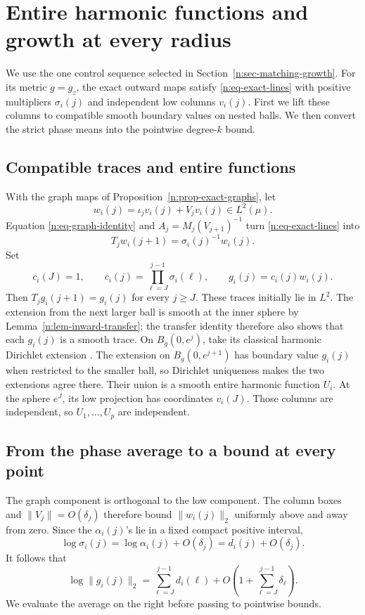 \section{Entire harmonic functions and growth at every radius}
\label{n:sec-growth}

We use the one control sequence selected in
Section~\ref{n:sec-matching-growth}. For its metric $g=g_z$, the exact
outward maps satisfy \eqref{n:eq-exact-lines} with positive multipliers
$\sigma_i(j)$ and independent low columns $v_i(j)$. First we lift these
columns to compatible smooth boundary values on nested balls. We then
convert the strict phase means into the pointwise degree-$k$ bound.

\subsection{Compatible traces and entire functions}

With the graph maps of Proposition~\ref{n:prop-exact-graphs}, let
\[
 w_i(j)=\iota_jv_i(j)+V_jv_i(j)\in L^2(\mu).
\]
Equation \eqref{n:eq-graph-identity} and \(A_j=M_j(V_{j+1})^{-1}\) turn
\eqref{n:eq-exact-lines} into
\[
 T_jw_i(j+1)=\sigma_i(j)^{-1}w_i(j).
\]
Set
\[
 c_i(J)=1,\qquad
 c_i(j)=\prod_{\ell=J}^{j-1}\sigma_i(\ell),\qquad
 g_i(j)=c_i(j)w_i(j).
\]
Then \(T_jg_i(j+1)=g_i(j)\) for every \(j\geq J\).
These traces initially lie in \(L^2\).  The extension from the next larger
ball is smooth at the inner sphere by Lemma~\ref{n:lem-inward-transfer};
the transfer identity therefore also shows that each \(g_i(j)\) is a smooth
trace.  On \(B_g(0,e^j)\), take its classical harmonic Dirichlet extension
\cite[Theorem~6.14, p.~107]{GilbargTrudinger}.  The
extension on \(B_g(0,e^{j+1})\) has boundary value \(g_i(j)\) when restricted
to the smaller ball, so Dirichlet uniqueness makes the two extensions
agree there.  Their union is a smooth entire harmonic function \(U_i\).
At the sphere \(e^J\), its low projection has coordinates \(v_i(J)\).
Those columns are independent, so \(U_1,\ldots,U_p\) are independent.

\subsection{From the phase average to a bound at every point}

The graph component is orthogonal to the low component.  The column boxes
and \(\|V_j\|=O(\delta_j)\) therefore bound \(\|w_i(j)\|_2\) uniformly
above and away from zero.  Since the \(\alpha_i(j)\)'s lie in a fixed
compact positive interval,
\[
 \log\sigma_i(j)=\log\alpha_i(j)+O(\delta_j)
                =d_i(j)+O(\delta_j).
\]
It follows that
\begin{equation}
 \log\|g_i(j)\|_2
 =\sum_{\ell=J}^{j-1}d_i(\ell)
       +O\!\left(1+\sum_{\ell=J}^{j-1}\delta_\ell\right).
 \label{n:eq-mesh-log-growth}
\end{equation}
We evaluate the average on the right before passing to pointwise bounds.

